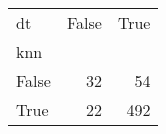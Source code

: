 \begin{tabular}{lrr}
\toprule
dt &  False &  True  \\
knn   &        &        \\
\midrule
False &     32 &     54 \\
True  &     22 &    492 \\
\bottomrule
\end{tabular}
